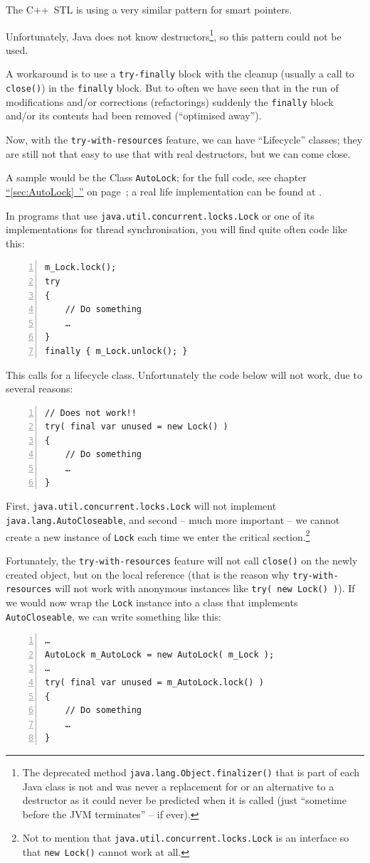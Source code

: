\documentclass[11pt,a4paper, titlepage, parskip=half, headsepline, footsepline, cleardoublepage=current, headheight=1cm]{scrbook}
\newcommand*{\tqfullvref}[1]{\hyperref[{#1}]{“\ref*{#1}~\nameref*{#1}”} on page~\pageref{#1}}
\begin{document}
The C++~STL is using a very similar pattern for smart pointers.

Unfortunately, Java does not know destructors\footnote{The deprecated method \lstinline|java.lang.Object.finalizer()| that is part of each Java class is not and was never a replacement for or an alternative to a destructor as it could never be predicted when it is called (just “sometime before the JVM terminates” – if ever).}, so this pattern could not be used.

A workaround is to use a \lstinline|try-finally| block with the cleanup (usually a call to \lstinline|close()|) in the \lstinline|finally| block. But to often we have seen that in the run of modifications and/or corrections (refactorings) suddenly the \lstinline|finally| block and/or its contents had been removed (“optimised away”).

Now, with the \lstinline|try-with-resources| feature, we can have “Lifecycle” classes; they are still not that easy to use that with real destructors, but we can come close.

A sample would be the Class \lstinline|AutoLock|; for the full code, see chapter \tqfullvref{sec:AutoLock}; a real life implementation can be found at \autocite{TQUADRAT_ORG_FOUNDATION_AUTOLOCK}.

In programs that use \lstinline|java.util.concurrent.locks.Lock| or one of its implementations for thread synchronisation, you will find quite often code like this:
\begin{lstlisting}[numbers=left]
m_Lock.lock();
try
{
    // Do something
    …
}
finally { m_Lock.unlock(); }
\end{lstlisting}

This calls for a lifecycle class. Unfortunately the code below will not work, due to several reasons:
\begin{lstlisting}[numbers=left]
// Does not work!!
try( final var unused = new Lock() )
{
    // Do something
    …
}
\end{lstlisting}

First, \lstinline|java.util.concurrent.locks.Lock| will not implement \lstinline|java.lang.AutoCloseable|, and second – much more important – we cannot create a new instance of \lstinline|Lock| each time we enter the critical section.\footnote{Not to mention that \lstinline|java.util.concurrent.locks.Lock| is an interface so that \lstinline|new Lock()| cannot work at all.}

Fortunately, the \lstinline|try-with-resources| feature will not call \lstinline|close()| on the newly created object, but on the local reference (that is the reason why \lstinline|try-with-resources| will not work with anonymous instances like \lstinline|try( new Lock() )|). If we would now wrap the \lstinline|Lock| instance into a class that implements \lstinline|AutoCloseable|, we can write something like this:
\begin{lstlisting}[numbers=left]
…
AutoLock m_AutoLock = new AutoLock( m_Lock );
…
try( final var unused = m_AutoLock.lock() )
{
    // Do something
    …
}
\end{lstlisting}
\end{document}
